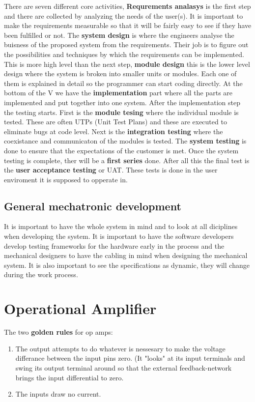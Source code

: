 \documentclass[12pt,a4paper]{article}
\begin{document}
There are seven different core activities, \textbf{Requrements analasys} 
is the first step and there are collected by analyzing the needs of the 
user(s). It is important to make the requirements measurable so that it
will be fairly easy to see if they have been fulfilled or not. The 
\textbf{system design} is where the engineers analyse the 
buisness of the proposed system from the requirements. 
Their job is to figure out the possibilities and techniques by which the requirements can be
implemented. This is more high level than the next step, \textbf{module
design} this is the lower level design where the system is broken into
smaller units or modules. Each one of them is explained in detail so the
programmer can start coding directly. At the bottom of the V we have the
\textbf{implementation} part where all the parts are implemented and put together
into one system. After the implementation step the testing starts. First
is the \textbf{module tesing} where the individual module is tested.
These are often UTPs (Unit Test Plans) and these are executed to
eliminate bugs at code level. Next is the \textbf{integration testing}
where the coexistance and communicaton of the modules is tested. The
\textbf{system testing} is done to ensure that the expectations of the
customer is met. Once the system testing is complete, ther will be a
\textbf{first series} done. After all this the final test is the
\textbf{user acceptance testing} or UAT. These tests is done in the user
enviroment it is supposed to opperate in.

\subsection{General mechatronic development}

It is important to have the whole system in mind and to look at all
diciplines when developing the system. It is important to have the
software developers develop testing frameworks for the hardware early in
the process and the mechanical designers to have the cabling in mind
when designing the mechanical system. It is also important to see the
specifications as dynamic, they will change during the work process. 




  \section{Operational Amplifier}
    The two \textbf{golden rules} for op amps:
    \begin{enumerate}
      \item The output attempts to do whatever is nessesary to make the
        voltage differance between the input pins zero. (It "looks" at its
        input terminals and swing its output terminal around so that the
        external feedback-network brings the input differential to zero.
      \item The inputs draw no current.
      \end{enumerate}
\end{document}
